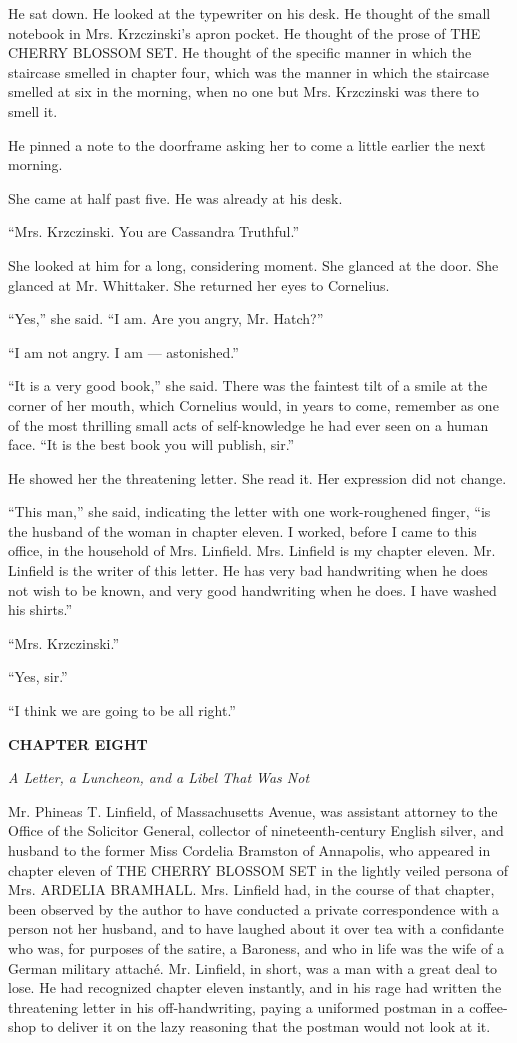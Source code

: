 \documentclass[12pt,openright]{book}
\begin{document}
He sat down. He looked at the typewriter on his desk. He thought of the small notebook in Mrs. Krzczinski’s apron pocket. He thought of the prose of THE CHERRY BLOSSOM SET. He thought of the specific manner in which the staircase smelled in chapter four, which was the manner in which the staircase smelled at six in the morning, when no one but Mrs. Krzczinski was there to smell it.

He pinned a note to the doorframe asking her to come a little earlier the next morning.

She came at half past five. He was already at his desk.

“Mrs. Krzczinski. You are Cassandra Truthful.”

She looked at him for a long, considering moment. She glanced at the door. She glanced at Mr. Whittaker. She returned her eyes to Cornelius.

“Yes,” she said. “I am. Are you angry, Mr. Hatch?”

“I am not angry. I am — astonished.”

“It is a very good book,” she said. There was the faintest tilt of a smile at the corner of her mouth, which Cornelius would, in years to come, remember as one of the most thrilling small acts of self-knowledge he had ever seen on a human face. “It is the best book you will publish, sir.”

He showed her the threatening letter. She read it. Her expression did not change.

“This man,” she said, indicating the letter with one work-roughened finger, “is the husband of the woman in chapter eleven. I worked, before I came to this office, in the household of Mrs. Linfield. Mrs. Linfield is my chapter eleven. Mr. Linfield is the writer of this letter. He has very bad handwriting when he does not wish to be known, and very good handwriting when he does. I have washed his shirts.”

“Mrs. Krzczinski.”

“Yes, sir.”

“I think we are going to be all right.”

\textbf{CHAPTER EIGHT}

\textit{A Letter, a Luncheon, and a Libel That Was Not}

Mr. Phineas T. Linfield, of Massachusetts Avenue, was assistant attorney to the Office of the Solicitor General, collector of nineteenth-century English silver, and husband to the former Miss Cordelia Bramston of Annapolis, who appeared in chapter eleven of THE CHERRY BLOSSOM SET in the lightly veiled persona of Mrs. ARDELIA BRAMHALL. Mrs. Linfield had, in the course of that chapter, been observed by the author to have conducted a private correspondence with a person not her husband, and to have laughed about it over tea with a confidante who was, for purposes of the satire, a Baroness, and who in life was the wife of a German military attaché. Mr. Linfield, in short, was a man with a great deal to lose. He had recognized chapter eleven instantly, and in his rage had written the threatening letter in his off-handwriting, paying a uniformed postman in a coffee-shop to deliver it on the lazy reasoning that the postman would not look at it.
\end{document}
